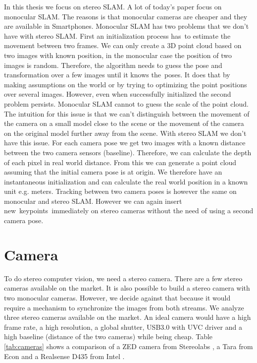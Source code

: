 \documentclass[11pt,a4paper,titlepage,oneside]{report}
\begin{document}
In this thesis we focus on stereo SLAM. A lot of today's paper focus on monocular SLAM. The reasons is that monocular cameras are cheaper and they are available in Smartphones. Monocular SLAM has two problems that we don’t have with stereo SLAM. First an initialization process has to estimate the movement between two frames. We can only create a 3D point cloud based on two images with known position, in the monocular case the position of two images is random. Therefore, the algorithm needs to guess the pose and transformation over a few images until it knows the poses. It does that by making assumptions on the world or by trying to optimizing the point positions over several images. However, even when successfully initialized the second problem persists. Monocular SLAM cannot to guess the scale of the point cloud. The intuition for this issue is that we can’t distinguish between the movement of the camera on a small model close to the scene or the movement of the camera on the original model further away from the scene. With stereo SLAM we don’t have this issue. For each camera pose we get two images with a known distance between the two camera sensors (baseline). Therefore, we can calculate the depth of each pixel in real world distance. From this we can generate a point cloud assuming that the initial camera pose is at origin. We therefore have an instantaneous initialization and can calculate the real world position in a known unit e.g. meters. Tracking between two camera poses is however the same on monocular and stereo SLAM. However we can again insert new keypoints immediately on stereo cameras without the need of using a second camera pose.

\section{Camera}

To do stereo computer vision, we need a stereo camera. There are a few stereo cameras available on the market. It is also possible to build a stereo camera with two monocular cameras. However, we decide against that because it would require a mechanism to synchronize the images from both streams. We analyze three stereo cameras available on the market. An ideal camera would have a high frame rate, a high resolution, a global shutter, USB3.0 with UVC driver and a high baseline (distance of the two cameras) while being cheap. Table \ref{tab:cameras} shows a comparison of a ZED camera from Stereolabs \cite{zed}, a Tara from Econ \cite{tara} and a Realsense D435 from Intel \cite{realsense}.
\end{document}
